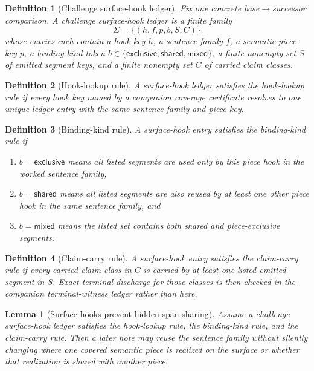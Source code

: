 \documentclass[11pt]{article}
\newtheorem{definition}{Definition}
\newtheorem{lemma}{Lemma}
\begin{document}
\begin{definition}[Challenge surface-hook ledger]
Fix one concrete base$\to$successor comparison.
A \emph{challenge surface-hook ledger} is a finite family
\[
\Sigma=\{(h,f,p,b,S,C)\}
\]
whose entries each contain a hook key $h$, a sentence family $f$, a semantic piece key $p$, a binding-kind token $b\in\{\textsf{exclusive},\textsf{shared},\textsf{mixed}\}$, a finite nonempty set $S$ of emitted segment keys, and a finite nonempty set $C$ of carried claim classes.
\end{definition}

\begin{definition}[Hook-lookup rule]
A surface-hook ledger satisfies the \emph{hook-lookup rule} if every hook key named by a companion coverage certificate resolves to one unique ledger entry with the same sentence family and piece key.
\end{definition}

\begin{definition}[Binding-kind rule]
A surface-hook entry satisfies the \emph{binding-kind rule} if
\begin{enumerate}[leftmargin=*]
\item $b=\textsf{exclusive}$ means all listed segments are used only by this piece hook in the worked sentence family,
\item $b=\textsf{shared}$ means all listed segments are also reused by at least one other piece hook in the same sentence family, and
\item $b=\textsf{mixed}$ means the listed set contains both shared and piece-exclusive segments.
\end{enumerate}
\end{definition}

\begin{definition}[Claim-carry rule]
A surface-hook entry satisfies the \emph{claim-carry rule} if every carried claim class in $C$ is carried by at least one listed emitted segment in $S$.
Exact terminal discharge for those classes is then checked in the companion terminal-witness ledger rather than here.
\end{definition}

\begin{lemma}[Surface hooks prevent hidden span sharing]
Assume a challenge surface-hook ledger satisfies the hook-lookup rule, the binding-kind rule, and the claim-carry rule.
Then a later note may reuse the sentence family without silently changing where one covered semantic piece is realized on the surface or whether that realization is shared with another piece.
\end{lemma}
\end{document}
